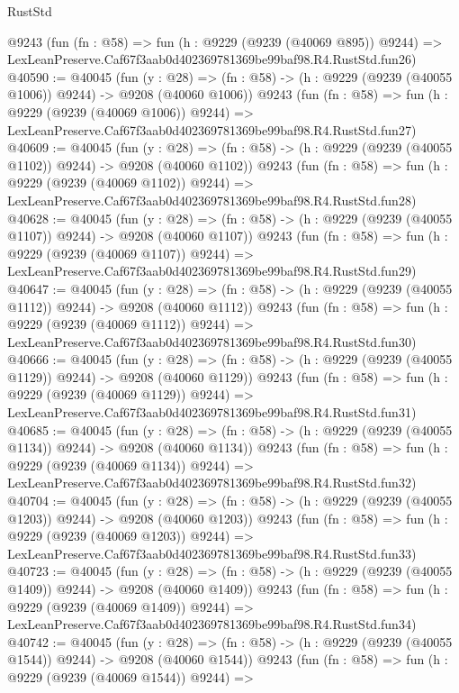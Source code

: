 \begin{lexlean}{RustStd}
\begin{coremodule}
    @9243
    (fun (fn : @58) =>
    fun (h : @9229 (@9239 (@40069 @895)) @9244) =>
    LexLeanPreserve.Caf67f3aab0d402369781369be99baf98.R4.RustStd.fun26)
@40590 := @40045
    (fun (y : @28) =>
    (fn : @58) -> (h : @9229 (@9239 (@40055 @1006)) @9244) -> @9208 (@40060 @1006))
    @9243
    (fun (fn : @58) =>
    fun (h : @9229 (@9239 (@40069 @1006)) @9244) =>
    LexLeanPreserve.Caf67f3aab0d402369781369be99baf98.R4.RustStd.fun27)
@40609 := @40045
    (fun (y : @28) =>
    (fn : @58) -> (h : @9229 (@9239 (@40055 @1102)) @9244) -> @9208 (@40060 @1102))
    @9243
    (fun (fn : @58) =>
    fun (h : @9229 (@9239 (@40069 @1102)) @9244) =>
    LexLeanPreserve.Caf67f3aab0d402369781369be99baf98.R4.RustStd.fun28)
@40628 := @40045
    (fun (y : @28) =>
    (fn : @58) -> (h : @9229 (@9239 (@40055 @1107)) @9244) -> @9208 (@40060 @1107))
    @9243
    (fun (fn : @58) =>
    fun (h : @9229 (@9239 (@40069 @1107)) @9244) =>
    LexLeanPreserve.Caf67f3aab0d402369781369be99baf98.R4.RustStd.fun29)
@40647 := @40045
    (fun (y : @28) =>
    (fn : @58) -> (h : @9229 (@9239 (@40055 @1112)) @9244) -> @9208 (@40060 @1112))
    @9243
    (fun (fn : @58) =>
    fun (h : @9229 (@9239 (@40069 @1112)) @9244) =>
    LexLeanPreserve.Caf67f3aab0d402369781369be99baf98.R4.RustStd.fun30)
@40666 := @40045
    (fun (y : @28) =>
    (fn : @58) -> (h : @9229 (@9239 (@40055 @1129)) @9244) -> @9208 (@40060 @1129))
    @9243
    (fun (fn : @58) =>
    fun (h : @9229 (@9239 (@40069 @1129)) @9244) =>
    LexLeanPreserve.Caf67f3aab0d402369781369be99baf98.R4.RustStd.fun31)
@40685 := @40045
    (fun (y : @28) =>
    (fn : @58) -> (h : @9229 (@9239 (@40055 @1134)) @9244) -> @9208 (@40060 @1134))
    @9243
    (fun (fn : @58) =>
    fun (h : @9229 (@9239 (@40069 @1134)) @9244) =>
    LexLeanPreserve.Caf67f3aab0d402369781369be99baf98.R4.RustStd.fun32)
@40704 := @40045
    (fun (y : @28) =>
    (fn : @58) -> (h : @9229 (@9239 (@40055 @1203)) @9244) -> @9208 (@40060 @1203))
    @9243
    (fun (fn : @58) =>
    fun (h : @9229 (@9239 (@40069 @1203)) @9244) =>
    LexLeanPreserve.Caf67f3aab0d402369781369be99baf98.R4.RustStd.fun33)
@40723 := @40045
    (fun (y : @28) =>
    (fn : @58) -> (h : @9229 (@9239 (@40055 @1409)) @9244) -> @9208 (@40060 @1409))
    @9243
    (fun (fn : @58) =>
    fun (h : @9229 (@9239 (@40069 @1409)) @9244) =>
    LexLeanPreserve.Caf67f3aab0d402369781369be99baf98.R4.RustStd.fun34)
@40742 := @40045
    (fun (y : @28) =>
    (fn : @58) -> (h : @9229 (@9239 (@40055 @1544)) @9244) -> @9208 (@40060 @1544))
    @9243
    (fun (fn : @58) =>
    fun (h : @9229 (@9239 (@40069 @1544)) @9244) =>

\end{coremodule}
\end{lexlean}
